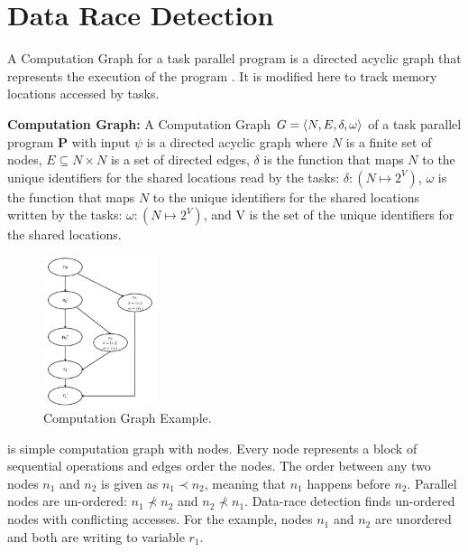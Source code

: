 \section{Data Race Detection} \label{sec:drd}
A Computation Graph for a task parallel program is a directed acyclic graph that represents the execution of the program \cite{dennis2012determinacy}. It is modified here to track memory locations accessed by tasks. 

\begin{definition}
\textbf{Computation Graph:} A Computation Graph 
$G = \langle N, E, \delta, \omega \rangle $ of a task parallel program \textbf{P} with input $\psi$ is a directed acyclic graph where $N$ is a finite set of nodes, $E \subseteq N \times N$ is a set of directed edges, $\delta$ is the function that maps $N$ to the unique identifiers for the shared locations read by the tasks: $\delta : (N \mapsto 2^{V})$, $\omega$ is the function that maps $N$ to the unique identifiers for the shared locations written by the tasks: $\omega : (N \mapsto 2^{V})$, and V is the set of the unique identifiers for the shared locations.
\end{definition}



\begin{figure}
  \centering
        \includegraphics[width=0.3\textwidth]{../figs/Fig3-1.pdf}
    \caption{Computation Graph Example.}
    \label{fig:cg}
    \vspace{-1em}
\end{figure}

 is simple computation graph with nodes. Every node represents a block of sequential operations and edges order the nodes. The order between any two nodes $n_1$ and $n_2$ is given as $n_1 \prec n_2$, meaning that $n_1$ happens before $n_2$. Parallel nodes are un-ordered: $n_1 \nprec n_2$ and $n_2 \nprec n_1$. Data-race detection finds un-ordered nodes with conflicting accesses. For the example, nodes $n_1$ and $n_2$ are unordered and both are writing to variable $r_1$.

